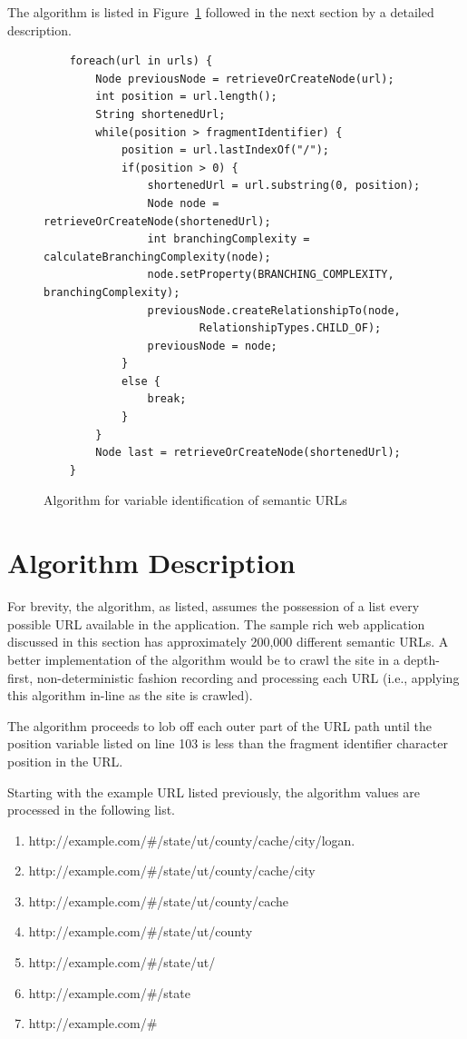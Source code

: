 The algorithm is listed in Figure~\ref{algorithm} followed in the next section by a detailed description.

\begin{figure}
\begin{lstlisting}
	foreach(url in urls) {
		Node previousNode = retrieveOrCreateNode(url);
		int position = url.length();
		String shortenedUrl;
		while(position > fragmentIdentifier) {
			position = url.lastIndexOf("/");
			if(position > 0) {
				shortenedUrl = url.substring(0, position);
				Node node = retrieveOrCreateNode(shortenedUrl);
				int branchingComplexity = calculateBranchingComplexity(node);
				node.setProperty(BRANCHING_COMPLEXITY, branchingComplexity);
				previousNode.createRelationshipTo(node, 
						RelationshipTypes.CHILD_OF);		
				previousNode = node;
			}
			else {
				break;
			}
		}
		Node last = retrieveOrCreateNode(shortenedUrl);
	}
\end{lstlisting}
\caption{Algorithm for variable identification of semantic URLs}
\label{algorithm}
\end{figure}

\section{Algorithm Description}
For brevity, the algorithm, as listed, assumes the possession of a list every possible URL available in the application.  The sample rich web application discussed in this section has approximately 200,000 different semantic URLs.  A better implementation of the algorithm would be to crawl the site in a depth-first, non-deterministic fashion recording and processing each URL (i.e., applying this algorithm in-line as the site is crawled).

The algorithm proceeds to lob off each outer part of the URL path until the position variable listed on line 103 is less than the fragment identifier character position in the URL.

Starting with the example URL listed previously, the algorithm values are processed in the following list.

\begin{enumerate}
	\item http://example.com/\#/state/ut/county/cache/city/logan.
	\item http://example.com/\#/state/ut/county/cache/city
	\item http://example.com/\#/state/ut/county/cache
	\item http://example.com/\#/state/ut/county
	\item http://example.com/\#/state/ut/
	\item http://example.com/\#/state
	\item http://example.com/\#
\end{enumerate}

